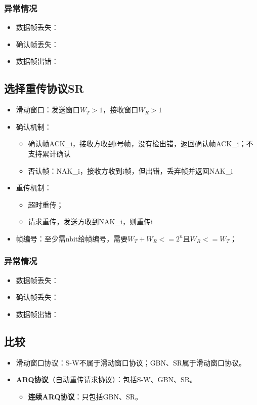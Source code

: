 \subsubsection{异常情况}
\begin{itemize}
    \item 数据帧丢失：
    \item 确认帧丢失：
    \item 数据帧出错：
\end{itemize}


\subsection{选择重传协议SR}
\begin{itemize}
    \item 滑动窗口：发送窗口\(W_T > 1\)，接收窗口\(W_R > 1\)
    \item 确认机制：\begin{itemize}
        \item 确认帧ACK\_i，接收方收到i号帧，没有检出错，返回确认帧ACK\_i；不支持累计确认
        \item 否认帧：NAK\_i，接收方收到i帧，但出错，丢弃帧并返回NAK\_i
    \end{itemize}
    \item 重传机制：\begin{itemize}
        \item 超时重传；
        \item 请求重传，发送方收到NAK\_i，则重传i
    \end{itemize}
    \item 帧编号：至少需nbit给帧编号，需要\(W_T + W_R <= 2^n\)且\(W_R <= W_T\)；
\end{itemize}

\subsubsection{异常情况}
\begin{itemize}
    \item 数据帧丢失：
    \item 确认帧丢失：
    \item 数据帧出错：
\end{itemize}


\subsection{比较}
\begin{itemize}
    \item 滑动窗口协议：S-W不属于滑动窗口协议；GBN、SR属于滑动窗口协议。
    \item \textbf{ARQ协议}（自动重传请求协议）：包括S-W、GBN、SR。\begin{itemize}
        \item \textbf{连续ARQ协议}：只包括GBN、SR。
    \end{itemize}
\end{itemize}

